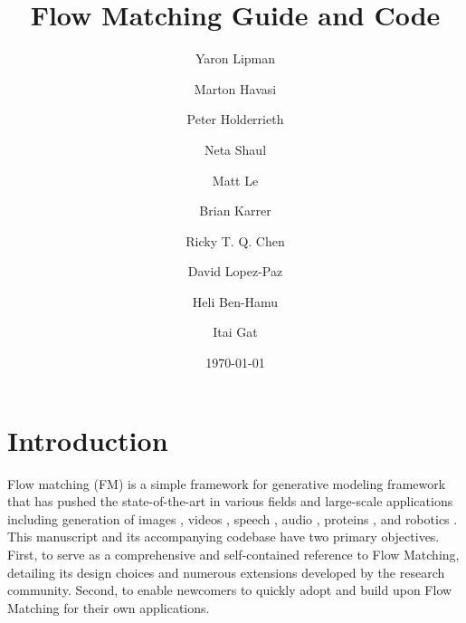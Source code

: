 \documentclass{fairmeta}
\title{Flow Matching Guide and Code}
\author[1]{Yaron Lipman}
\author[1]{Marton Havasi}
\author[2]{Peter Holderrieth}
\author[3]{Neta Shaul}
\author[1]{Matt Le}
\author[1]{Brian Karrer}
\author[1]{\qquad \qquad \qquad Ricky T. Q. Chen}
\author[1]{David Lopez-Paz}
\author[3]{Heli Ben-Hamu}
\author[1]{Itai Gat}
\affiliation[1]{FAIR at Meta}
\affiliation[2]{MIT CSAIL}
\affiliation[3]{Weizmann Institute of Science}
\date{\today}
\numberwithin{equation}{section}
\begin{document}
\maketitle



\tableofcontents
\clearpage
\newpage

\section{Introduction}\label{section:intro}

Flow matching (FM) \citep{lipman2022flow,albergo2022building,liu2022flow} is a simple framework for generative modeling framework that has pushed the state-of-the-art in various fields and large-scale applications including generation of images \citep{esser2024scaling}, videos \citep{polyak2024moviegencastmedia}, speech \citep{le2024voicebox}, audio \citep{vyas2023audiobox}, proteins \citep{huguet2024sequence}, and robotics \citep{black2024robotics}.
This manuscript and its accompanying codebase have two primary objectives.
First, to serve as a comprehensive and self-contained reference to Flow Matching, detailing its design choices and numerous extensions developed by the research community.
Second, to enable newcomers to quickly adopt and build upon Flow Matching for their own applications.
\end{document}
